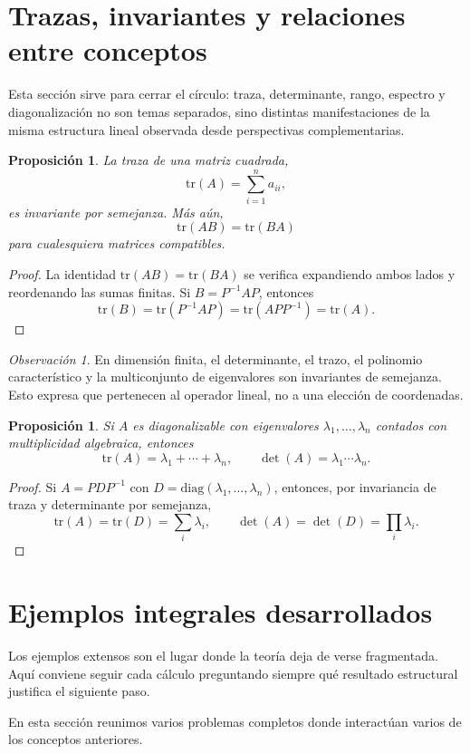\documentclass[10pt,a4paper,oneside]{article}
\theoremstyle{plain}
\newtheorem{proposition}[theorem]{Proposición}
\theoremstyle{definition}
\theoremstyle{remark}
\newtheorem{remark}[theorem]{Observación}
\newcommand{\tr}{\mathrm{tr}}
\newcommand{\diag}{\mathrm{diag}}
\begin{document}
\section{Trazas, invariantes y relaciones entre conceptos}
\begin{summaryBox}
Esta sección sirve para cerrar el círculo: traza, determinante, rango, espectro y diagonalización no son temas separados, sino distintas manifestaciones de la misma estructura lineal observada desde perspectivas complementarias.
\end{summaryBox}
\begin{proposition}
La traza de una matriz cuadrada,
\[
\tr(A)=\sum_{i=1}^n a_{ii},
\]
es invariante por semejanza. Más aún,
\[
\tr(AB)=\tr(BA)
\]
para cualesquiera matrices compatibles.
\end{proposition}

\begin{proof}
La identidad \(\tr(AB)=\tr(BA)\) se verifica expandiendo ambos lados y reordenando las sumas finitas. Si \(B=P^{-1}AP\), entonces
\[
\tr(B)=\tr(P^{-1}AP)=\tr(APP^{-1})=\tr(A).
\]
\end{proof}

\begin{remark}
En dimensión finita, el determinante, el trazo, el polinomio característico y la multiconjunto de eigenvalores son invariantes de semejanza. Esto expresa que pertenecen al operador lineal, no a una elección de coordenadas.
\end{remark}

\begin{proposition}
Si \(A\) es diagonalizable con eigenvalores \(\lambda_1,\dots,\lambda_n\) contados con multiplicidad algebraica, entonces
\[
\tr(A)=\lambda_1+\cdots+\lambda_n,
\qquad
\det(A)=\lambda_1\cdots\lambda_n.
\]
\end{proposition}

\begin{proof}
Si \(A=PDP^{-1}\) con \(D=\diag(\lambda_1,\dots,\lambda_n)\), entonces, por invariancia de traza y determinante por semejanza,
\[
\tr(A)=\tr(D)=\sum_i\lambda_i,
\qquad
\det(A)=\det(D)=\prod_i\lambda_i.
\]
\end{proof}

\section{Ejemplos integrales desarrollados}
\begin{methodBox}
Los ejemplos extensos son el lugar donde la teoría deja de verse fragmentada. Aquí conviene seguir cada cálculo preguntando siempre qué resultado estructural justifica el siguiente paso.
\end{methodBox}
En esta sección reunimos varios problemas completos donde interactúan varios de los conceptos anteriores.
\end{document}
